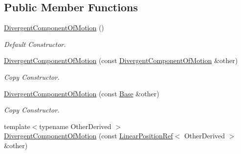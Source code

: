 \subsection*{Public Member Functions}
\begin{DoxyCompactItemize}
\item 
\hyperlink{classow__core_1_1DivergentComponentOfMotion_a05f9d0c01e2d334ca1ef4219565362cc}{Divergent\+Component\+Of\+Motion} ()\hypertarget{classow__core_1_1DivergentComponentOfMotion_a05f9d0c01e2d334ca1ef4219565362cc}{}\label{classow__core_1_1DivergentComponentOfMotion_a05f9d0c01e2d334ca1ef4219565362cc}

\begin{DoxyCompactList}\small\item\em Default Constructor. \end{DoxyCompactList}\item 
\hyperlink{classow__core_1_1DivergentComponentOfMotion_a4b746d335c8939e5441b253dc11b697c}{Divergent\+Component\+Of\+Motion} (const \hyperlink{classow__core_1_1DivergentComponentOfMotion}{Divergent\+Component\+Of\+Motion} \&other)\hypertarget{classow__core_1_1DivergentComponentOfMotion_a4b746d335c8939e5441b253dc11b697c}{}\label{classow__core_1_1DivergentComponentOfMotion_a4b746d335c8939e5441b253dc11b697c}

\begin{DoxyCompactList}\small\item\em Copy Constructor. \end{DoxyCompactList}\item 
\hyperlink{classow__core_1_1DivergentComponentOfMotion_a4347cc0b54b5261721bf8f70ca987277}{Divergent\+Component\+Of\+Motion} (const \hyperlink{classow__core_1_1LinearPosition}{Base} \&other)\hypertarget{classow__core_1_1DivergentComponentOfMotion_a4347cc0b54b5261721bf8f70ca987277}{}\label{classow__core_1_1DivergentComponentOfMotion_a4347cc0b54b5261721bf8f70ca987277}

\begin{DoxyCompactList}\small\item\em Copy Constructor. \end{DoxyCompactList}\item 
{\footnotesize template$<$typename Other\+Derived $>$ }\\\hyperlink{classow__core_1_1DivergentComponentOfMotion_a5e3e7445884f223db966129267d66dcd}{Divergent\+Component\+Of\+Motion} (const \hyperlink{classow__core_1_1LinearPositionRef}{Linear\+Position\+Ref}$<$ Other\+Derived $>$ \&other)\hypertarget{classow__core_1_1DivergentComponentOfMotion_a5e3e7445884f223db966129267d66dcd}{}\label{classow__core_1_1DivergentComponentOfMotion_a5e3e7445884f223db966129267d66dcd}


\end{DoxyCompactItemize}
